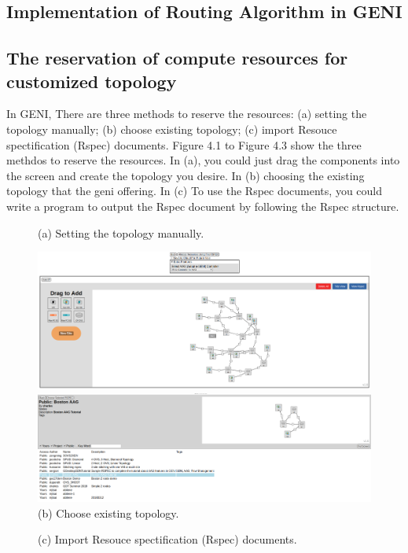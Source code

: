 \documentclass[a4paper,12pt]{report}
\begin{document}
\begin{CJK*}{UTF8}{bkai}
\begin{large}
  \chapter{Implementation of Routing Algorithm in GENI}
	  	\section{The reservation of compute resources for customized topology}
			\qquad In GENI, There are three methods to reserve the resources: (a) setting the topology manually; (b) choose existing topology; (c) import Resouce spectification (Rspec) documents. Figure 4.1 to Figure 4.3 show the three methdos to reserve the resources. In (a), you could just drag the components into the screen and create the topology you desire. In (b) choosing the existing topology that the geni offering. In (c) To use the Rspec documents, you could write a program to output the Rspec document by following the Rspec structure.
			\begin{figure}
	          \caption{(a) Setting the topology manually.}
	          \centering
	            \includegraphics[width=1.0\textwidth]{geni_manual.png}
	          \caption{(b) Choose existing topology.}
	            \includegraphics[width=1.0\textwidth]{choose_existing.png}
	      	\end{figure}
	      	\begin{figure}	         
	          \centering
	          \caption{(c) Import Resouce spectification (Rspec) documents.}

\end{figure}
\end{large}
\end{CJK*}
\end{document}
